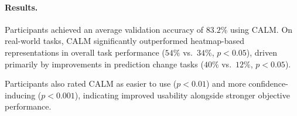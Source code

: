 \paragraph{Results.}
Participants achieved an average validation accuracy of $83.2\%$ using CALM. On real-world tasks, CALM significantly outperformed heatmap-based representations in overall task performance ($54\%$ vs.\ $34\%$, $p < 0.05$), driven primarily by improvements in prediction change tasks ($40\%$ vs.\ $12\%$, $p < 0.05$).

Participants also rated CALM as easier to use ($p < 0.01$) and more confidence-inducing ($p < 0.001$), indicating improved usability alongside stronger objective performance.

\newpage
